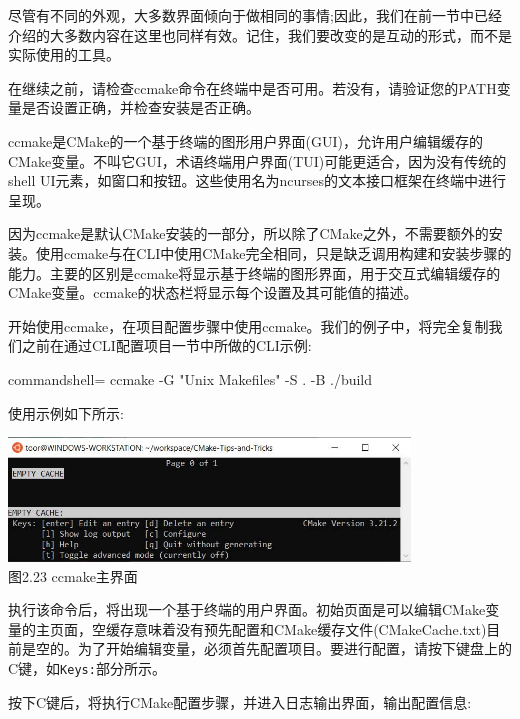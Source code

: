 
尽管有不同的外观，大多数界面倾向于做相同的事情;因此，我们在前一节中已经介绍的大多数内容在这里也同样有效。记住，我们要改变的是互动的形式，而不是实际使用的工具。

\begin{tcolorbox}[colback=webgreen!5!white,colframe=webgreen!75!black,title=Note]
在继续之前，请检查ccmake命令在终端中是否可用。若没有，请验证您的PATH变量是否设置正确，并检查安装是否正确。
\end{tcolorbox}


ccmake是CMake的一个基于终端的图形用户界面(GUI)，允许用户编辑缓存的CMake变量。不叫它GUI，术语终端用户界面(TUI)可能更适合，因为没有传统的shell UI元素，如窗口和按钮。这些使用名为ncurses的文本接口框架在终端中进行呈现。

因为ccmake是默认CMake安装的一部分，所以除了CMake之外，不需要额外的安装。使用ccmake与在CLI中使用CMake完全相同，只是缺乏调用构建和安装步骤的能力。主要的区别是ccmake将显示基于终端的图形界面，用于交互式编辑缓存的CMake变量。ccmake的状态栏将显示每个设置及其可能值的描述。

开始使用ccmake，在项目配置步骤中使用ccmake。我们的例子中，将完全复制我们之前在通过CLI配置项目一节中所做的CLI示例:

\begin{tcblisting}{commandshell={}}
ccmake -G "Unix Makefiles" -S . -B ./build
\end{tcblisting}

使用示例如下所示:

\begin{center}
\includegraphics[width=0.8\textwidth]{content/1/chapter2/images/23.jpg}\\
图2.23 ccmake主界面
\end{center}

执行该命令后，将出现一个基于终端的用户界面。初始页面是可以编辑CMake变量的主页面，空缓存意味着没有预先配置和CMake缓存文件(CMakeCache.txt)目前是空的。为了开始编辑变量，必须首先配置项目。要进行配置，请按下键盘上的C键，如\texttt{Keys:}部分所示。

按下C键后，将执行CMake配置步骤，并进入日志输出界面，输出配置信息:

